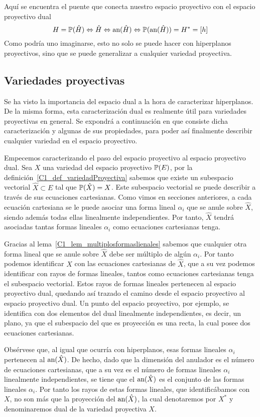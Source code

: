 Aquí se encuentra el puente que conecta nuestro espacio proyectivo con el espacio proyectivo dual
\begin{equation}
	H=\mathbb{P}(\hat{H})\Leftrightarrow \hat{H}\Leftrightarrow \text{an}(\hat{H})\Leftrightarrow \mathbb{P}(\text{an}(\hat{H}))=H^*=[h]
\end{equation}
Como podría uno imaginarse, esto no solo se puede hacer con hiperplanos proyectivos, sino que se puede generalizar a cualquier variedad proyectiva.
\subsection{Variedades proyectivas}
Se ha visto la importancia del espacio dual a la hora de caracterizar hiperplanos. De la misma forma, esta caracterización dual es realmente útil para variedades proyectivas en general. Se expondrá a continuación en que consiste dicha caracterización y algunas de sus propiedades, para poder así finalmente describir cualquier variedad en el espacio proyectivo.

Empecemos caracterizando el paso del espacio proyectivo al espacio proyectivo dual. Sea $X$ una variedad del espacio proyectivo $\mathbb{P}(E)$, por la definición~\ref{C1_def_variedadProyectiva} sabemos que existe un subespacio vectorial $\hat{X}\subset E$ tal que $\mathbb{P}(\hat{X})=X$. Este subespacio vectorial se puede describir a través de sus ecuaciones cartesianas. Como vimos en secciones anteriores, a cada ecuación cartesiana se le puede asociar una forma lineal $\alpha_i$ que se anule sobre $\hat{X}$, siendo además todas ellas linealmente independientes. Por tanto, $\hat{X}$ tendrá asociadas tantas formas lineales $\alpha_i$ como ecuaciones cartesianas tenga. 

Gracias al lema~\ref{C1_lem_multiplosformaslienales} sabemos que cualquier otra forma lineal que se anule sobre $\hat{X}$ debe ser múltiplo de algún $\alpha_i$. Por tanto podemos identificar $X$ con las ecuaciones cartesianas de $\hat{X}$, que a su vez podemos identificar con rayos de formas lineales, tantos como ecuaciones cartesianas tenga el subespacio vectorial. Estos rayos de formas lineales pertenecen al espacio proyectivo dual, quedando así trazado el camino desde el espacio proyectivo al espacio proyectivo dual. Un punto del espacio proyectivo, por ejemplo, se identifica con dos elementos del dual linealmente independientes, es decir, un plano, ya que el subespacio del que es proyección es una recta, la cual posee dos ecuaciones cartesianas.

Obsérvese que, al igual que ocurría con hiperplanos, esas formas lineales $\alpha_i$ pertenecen al $\text{an}(\hat{X})$. De hecho, dado que la dimensión del anulador es el número de ecuaciones cartesianas, que a su vez es el número de formas lineales $\alpha_i$ linealmente independientes, se tiene que el $\text{an}(\hat{X})$ es el conjunto de las formas lineales $\alpha_i$. Por tanto los rayos de estas formas lineales, que identificábamos con $X$, no son más que la proyección del $\text{an}(\hat{X})$, la cual denotaremos por $X^*$ y denominaremos dual de la variedad proyectiva $X$.

